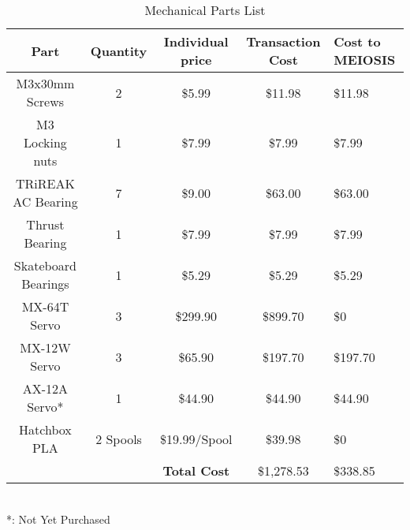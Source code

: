 \begin{table}[htp]
  \center
  \caption{Mechanical Parts List}
  \label{fig:mechbom}
\begin{tabular}{c|c|c|c|C{2cm}}
Part & Quantity & Individual price & Transaction Cost & Cost to MEIOSIS \\\hline
M3x30mm Screws & 2 & \$5.99 & \$11.98 & \$11.98 \\
M3 Locking nuts & 1 & \$7.99 & \$7.99 & \$7.99 \\
TRiREAK AC Bearing & 7 & \$9.00 & \$63.00 & \$63.00 \\
Thrust Bearing & 1 & \$7.99 & \$7.99 & \$7.99 \\
Skateboard Bearings & 1 & \$5.29 & \$5.29 & \$5.29 \\
MX-64T Servo & 3 & \$299.90 & \$899.70 & \$0 \\
MX-12W Servo & 3 & \$65.90 & \$197.70 & \$197.70 \\
AX-12A Servo* & 1 & \$44.90 & \$44.90 & \$44.90 \\
Hatchbox PLA & 2 Spools & \$19.99/Spool & \$39.98 & \$0 \\
& & \textbf{Total Cost} & \$1,278.53 & \$338.85 \\
\end{tabular}\\
\small{*: Not Yet Purchased}
\end{table}
